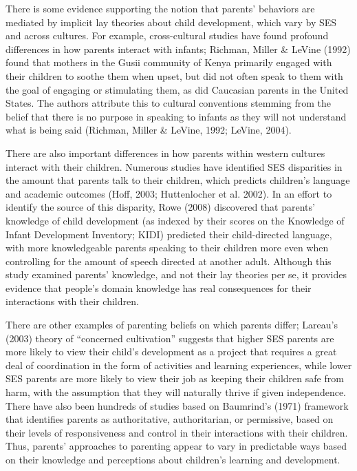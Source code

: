 \documentclass[10pt, letterpaper]{article}
\begin{document}
There is some evidence supporting the notion that parents' behaviors are
mediated by implicit lay theories about child development, which vary by
SES and across cultures. For example, cross-cultural studies have found
profound differences in how parents interact with infants; Richman,
Miller \& LeVine (1992) found that mothers in the Gusii community of
Kenya primarily engaged with their children to soothe them when upset,
but did not often speak to them with the goal of engaging or stimulating
them, as did Caucasian parents in the United States. The authors
attribute this to cultural conventions stemming from the belief that
there is no purpose in speaking to infants as they will not understand
what is being said (Richman, Miller \& LeVine, 1992; LeVine, 2004).

There are also important differences in how parents within western
cultures interact with their children. Numerous studies have identified
SES disparities in the amount that parents talk to their children, which
predicts children's language and academic outcomes (Hoff, 2003;
Huttenlocher et al. 2002). In an effort to identify the source of this
disparity, Rowe (2008) discovered that parents' knowledge of child
development (as indexed by their scores on the Knowledge of Infant
Development Inventory; KIDI) predicted their child-directed language,
with more knowledgeable parents speaking to their children more even
when controlling for the amount of speech directed at another adult.
Although this study examined parents' knowledge, and not their lay
theories per se, it provides evidence that people's domain knowledge has
real consequences for their interactions with their children.

There are other examples of parenting beliefs on which parents differ;
Lareau's (2003) theory of ``concerned cultivation'' suggests that higher
SES parents are more likely to view their child's development as a
project that requires a great deal of coordination in the form of
activities and learning experiences, while lower SES parents are more
likely to view their job as keeping their children safe from harm, with
the assumption that they will naturally thrive if given independence.
There have also been hundreds of studies based on Baumrind's (1971)
framework that identifies parents as authoritative, authoritarian, or
permissive, based on their levels of responsiveness and control in their
interactions with their children. Thus, parents' approaches to parenting
appear to vary in predictable ways based on their knowledge and
perceptions about children's learning and development.
\end{document}
